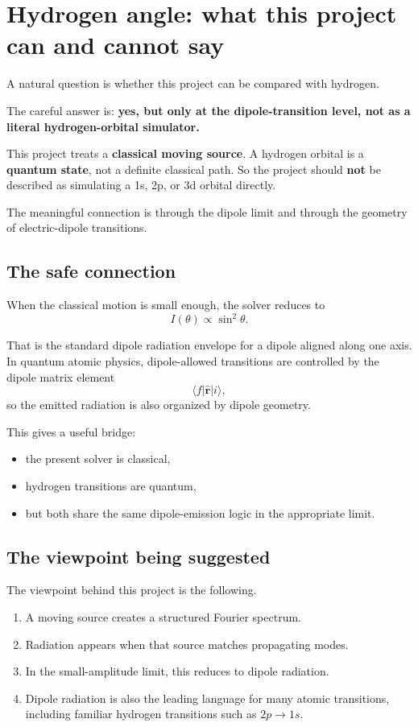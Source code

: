 \documentclass[11pt]{article}
\begin{document}
\section{Hydrogen angle: what this project can and cannot say}

A natural question is whether this project can be compared with hydrogen.

The careful answer is: \textbf{yes, but only at the dipole-transition level, not as a literal hydrogen-orbital simulator.}

This project treats a \textbf{classical moving source}. A hydrogen orbital is a \textbf{quantum state}, not a definite classical path. So the project should \textbf{not} be described as simulating a 1s, 2p, or 3d orbital directly.

The meaningful connection is through the dipole limit and through the geometry of electric-dipole transitions.

\subsection*{The safe connection}

When the classical motion is small enough, the solver reduces to
\[
I(\theta)\propto \sin^2\theta.
\]

That is the standard dipole radiation envelope for a dipole aligned along one axis. In quantum atomic physics, dipole-allowed transitions are controlled by the dipole matrix element
\[
\langle f|\hat{\mathbf{r}}|i\rangle,
\]
so the emitted radiation is also organized by dipole geometry.

This gives a useful bridge:
\begin{itemize}
    \item the present solver is classical,
    \item hydrogen transitions are quantum,
    \item but both share the same dipole-emission logic in the appropriate limit.
\end{itemize}

\subsection*{The viewpoint being suggested}

The viewpoint behind this project is the following.

\begin{enumerate}
    \item A moving source creates a structured Fourier spectrum.
    \item Radiation appears when that source matches propagating modes.
    \item In the small-amplitude limit, this reduces to dipole radiation.
    \item Dipole radiation is also the leading language for many atomic transitions, including familiar hydrogen transitions such as $2p\to1s$.
\end{enumerate}
\end{document}
